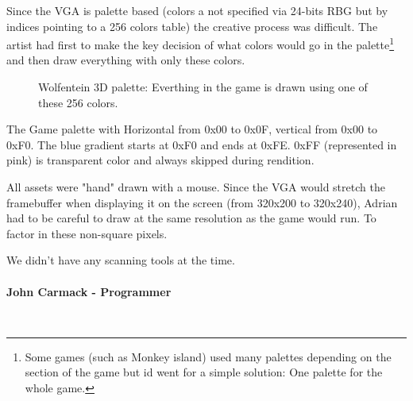 \documentclass[book.tex]{subfiles}
\begin{document}
\par
Since the VGA is palette based (colors a not specified via 24-bits RBG but by indices pointing to a 256 colors table) the creative process was difficult. The artist had first to make the key decision of what colors would go in the palette\footnote{Some games (such as Monkey island) used many palettes depending on the section of the game but id went for a simple solution: One palette for the whole game.} and then draw everything with only these colors.\\
\begin{figure}[H]
  \centering
{}
 \caption{Wolfentein 3D palette: Everthing in the game is drawn using one of these 256 colors.}
\end{figure}
The Game palette with Horizontal from 0x00 to 0x0F, vertical from 0x00 to 0xF0. The blue gradient starts at 0xF0 and ends at 0xFE. 0xFF (represented in pink) is transparent color and always skipped during rendition.\\
\par

All assets were "hand" drawn with a mouse. Since the VGA would stretch the framebuffer when displaying it on the screen (from 320x200 to 320x240), Adrian had to be careful to draw at the same resolution as the game would run. To factor in these non-square pixels.\\
\par
\begin{fancyquotes}
We didn't have any scanning tools at the time.\\
\\
\textbf{John Carmack - Programmer}
\end{fancyquotes}
\\
\end{document}
